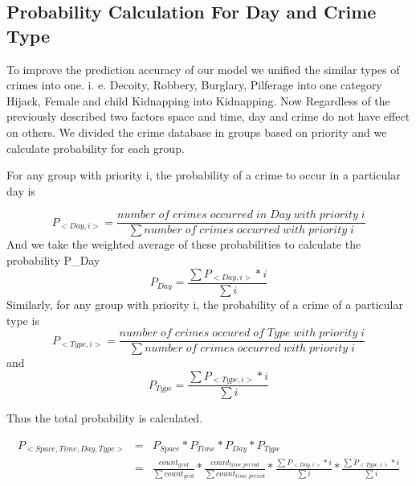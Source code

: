 \documentclass{sig-alternate}
\begin{document}
       
       
 \subsection{Probability Calculation For Day and Crime Type}
To improve the prediction accuracy of our model we unified the similar types of crimes into one. i. e. Decoity, Robbery, Burglary, Pilferage into one category Hijack, Female and child Kidnapping into Kidnapping. Now Regardless of the previously described two factors space and time, day and crime do not have effect on others. We divided the crime database in groups based on priority and we calculate probability for each group.

For any group with priority i, the probability of a crime to occur in a particular day is 
   
 \begin{equation}
           P_{<Day,i>} =  \frac{number \; of \;crimes\; occurred\; in\; Day\; with\; priority\; i}{\sum number\; of \; crimes\; occurred\; with\; priority\; i}
           \label{probday}
       \end{equation}
        And we take the weighted average of these probabilities to calculate the probability P\_{Day}
       	 \begin{equation}
       	                P_{Day} =  \frac{\sum P_{<Day,i>} * i}{\sum i}
                              \label{wprobday}
       	       \end{equation}
     Similarly, for any group with priority i, the probability of a crime of a particular type is 
      \begin{equation}
                P_{<Type,i>} =  \frac{number \; of \; crimes \; occured \; of\; Type\; with\; priority \; i}{\sum number \; of \; crimes \; occurred \; with\; priority\; i}
                \label{probtype}
       \end{equation}
       and 
       \begin{equation}
              	                P_{Type} =  \frac{\sum P_{<Type,i>} * i}{\sum i}
                                     \label{wprobtype}
         \end{equation}
         
         Thus the total probability is calculated.
         
          \begin{eqnarray*}
         	 P_{<Space,Time,Day,Type>}
          &=& P_{Space}*P_{Time}*P_{Day}*P_{Type}\\
          &=& \frac{ count_{grid}}{\sum count_{grid}} * \frac{ count_{time\_period}}{\sum count_{time\_period}}* \frac{\sum P_{<Day,i>} * i}{\sum i} *\frac{\sum P_{<Type,i>} * i}{\sum i} 
          \label{probtotal}
          \end{eqnarray*}
          
\end{document}
